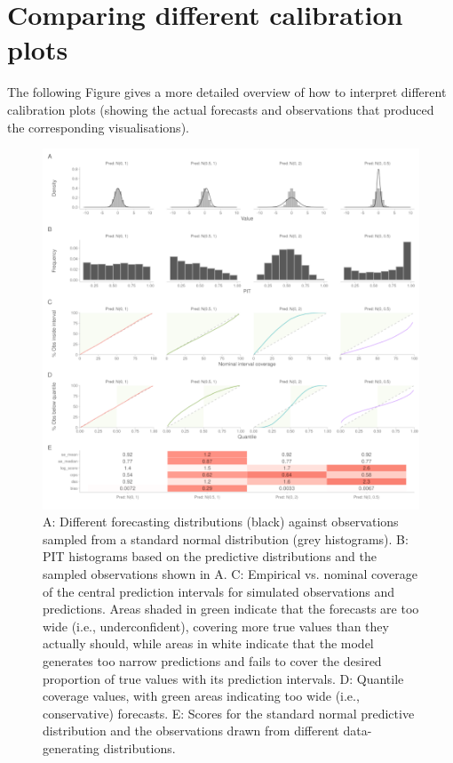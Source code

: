 \documentclass[
]{jss}
\begin{document}
\clearpage

\section{Comparing different calibration plots}

The following Figure gives a more detailed overview of how to interpret
different calibration plots (showing the actual forecasts and
observations that produced the corresponding visualisations).

\begin{CodeChunk}
\begin{figure}[!h]

{\centering \includegraphics[width=1\linewidth,]{output/calibration-diagnostic-examples} 

}

\caption[A]{A: Different forecasting distributions (black) against observations sampled from a standard normal distribution (grey histograms). B: PIT histograms based on the predictive distributions and the sampled observations shown in A. C: Empirical vs. nominal coverage of the central prediction intervals for simulated observations and predictions. Areas shaded in green indicate that the forecasts are too wide (i.e., underconfident), covering more true values than they actually should, while areas in white indicate that the model generates too narrow predictions and fails to cover the desired proportion of true values with its prediction intervals. D: Quantile coverage values, with green areas indicating too wide (i.e., conservative) forecasts. E: Scores for the standard normal predictive distribution and the observations drawn from different data-generating distributions.}\label{fig:calibration-plots}
\end{figure}
\end{CodeChunk}
\end{document}
